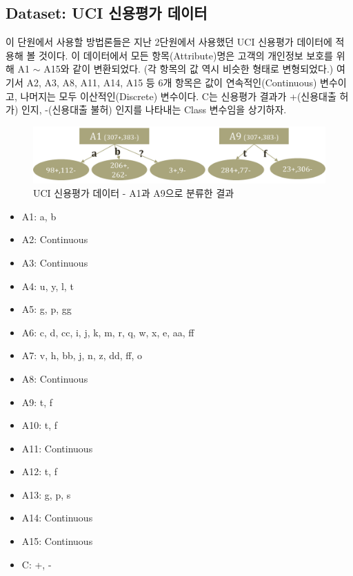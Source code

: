 \documentclass[a4paper]{oblivoir}
\begin{document}
\subsection{Dataset: UCI 신용평가 데이터}
이 단원에서 사용할 방법론들은 지난 2단원에서 사용했던 UCI 신용평가 데이터에 적용해 볼 것이다. 이 데이터에서 모든 항목(Attribute)명은 고객의 개인정보 보호를 위해 A1 $\sim$ A15와 같이 변환되었다. (각 항목의 값 역시 비슷한 형태로 변형되었다.) 여기서 A2, A3, A8, A11, A14, A15 등 6개 항목은 값이 연속적인(Continuous) 변수이고, 나머지는 모두 이산적인(Discrete) 변수이다. C는 신용평가 결과가 +(신용대출 허가) 인지, -(신용대출 불허) 인지를 나타내는 Class 변수임을 상기하자. \\
\begin{figure}[ht]
\centering
\includegraphics[scale=0.6]{UCI_Data.png}
\caption{UCI 신용평가 데이터 - A1과 A9으로 분류한 결과}
\label{Figure 4-3}
\end{figure}

\begin{itemize}\itemsep0pt
\item A1: a, b
\item A2: Continuous
\item A3: Continuous
\item A4: u, y, l, t
\item A5: g, p, gg
\item A6: c, d, cc, i, j, k, m, r, q, w, x, e, aa, ff
\item A7: v, h, bb, j, n, z, dd, ff, o
\item A8: Continuous
\item A9: t, f
\item A10: t, f
\item A11: Continuous
\item A12: t, f
\item A13: g, p, s
\item A14: Continuous
\item A15: Continuous
\item C: +, -
\end{itemize}

\end{document}
